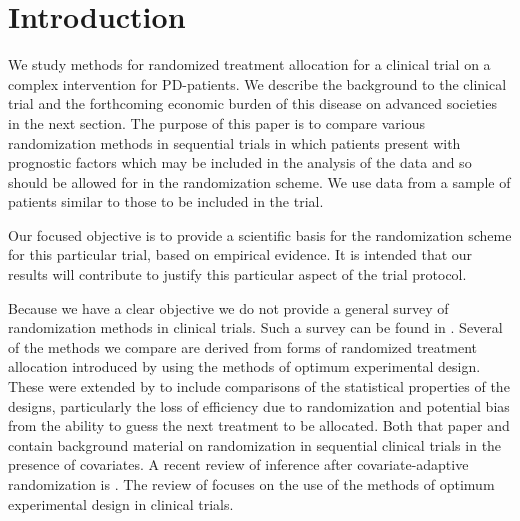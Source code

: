 \documentclass[number,12pt,review]{elsarticle}
\begin{document}
\linenumbers%

\section{Introduction}

\label{introsec}

We study methods for randomized treatment allocation for a clinical trial on a complex intervention for \ac{PD}-patients. We describe the background to the clinical trial and the forthcoming economic burden of this disease on advanced societies in the next section. The purpose of this paper is to compare various randomization methods in sequential trials in which patients present with prognostic factors which may be included in the analysis of the data and so should be allowed for in the randomization scheme. We use data from a sample of patients similar to those to be included in the trial.

Our focused objective is to provide a scientific basis for the randomization scheme for this particular trial, based on empirical evidence. It is intended that our results will contribute to justify this particular aspect of the trial protocol.

Because we have a clear objective we do not provide a general survey of randomization methods in clinical trials. Such a survey can be found in \citet{ros+l:2016}. Several of the methods we compare are derived from forms of randomized treatment allocation introduced by \citet{aca:82} using the methods of optimum experimental design. These were extended by \citet{aca:2002} to include comparisons of the statistical properties of the designs, particularly the loss of efficiency due to randomization and potential bias from the ability to guess the next treatment to be allocated. Both that paper and \citet{ros+sverd:2008} contain background material on randomization in sequential clinical trials in the presence of covariates. A recent review of inference after covariate-adaptive randomization is \citet{MaHuCovar:2020}. The review of \citet{sverdlov2020optimal} focuses on the use of the methods of optimum experimental design in clinical trials.
\end{document}
